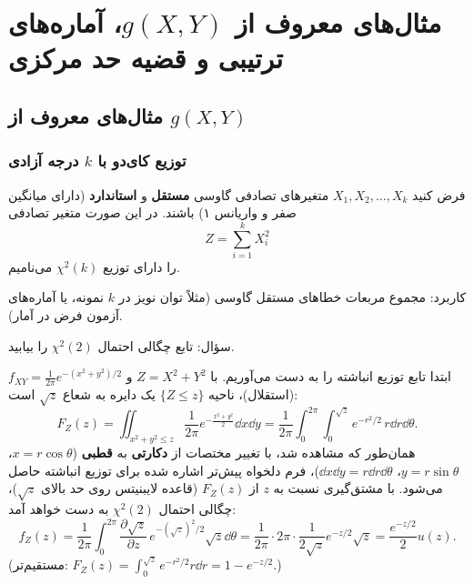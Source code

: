\chapter{مثال‌های معروف از $g(X,Y)$، آماره‌های ترتیبی و قضیه حد مرکزی}

\section{مثال‌های معروف از $g(X,Y)$}

\subsection{توزیع کای‌دو  با $k$ درجه آزادی}

\begin{definition}
فرض کنید $X_1,X_2,\ldots,X_k$ متغیرهای تصادفی گاوسی \textbf{مستقل} و \textbf{استاندارد} (دارای میانگین صفر و واریانس ۱) باشند. در این صورت متغیر تصادفی
\[
Z=\sum_{i=1}^{k}X_i^2
\]
را دارای توزیع $\chi^2(k)$ می‌نامیم.
\end{definition}
کاربرد: مجموع مربعات خطاهای مستقل گاوسی (مثلاً توان نویز در $k$ نمونه، یا آماره‌های آزمون فرض در آمار).

\begin{example}
\textcolor{red!70!black}{سؤال:} تابع چگالی احتمال $\chi^2(2)$ را بیابید.
\begin{solution}
ابتدا تابع توزیع انباشته را به دست می‌آوریم. با $Z=X^2+Y^2$ و $f_{XY}=\frac{1}{2\pi}e^{-(x^2+y^2)/2}$ (استقلال)، ناحیه $\{Z\le z\}$ یک دایره به شعاع $\sqrt z$ است:
\[
F_Z(z)=\iint_{x^2+y^2\le z}\frac{1}{2\pi}e^{-\frac{x^2+y^2}{2}}\dd x\dd y=\frac{1}{2\pi}\int_0^{2\pi}\!\!\int_0^{\sqrt z}e^{-r^2/2}\,r\dd r\dd\theta .
\]
همان‌طور که مشاهده شد، با تغییر مختصات از \textbf{دکارتی} به \textbf{قطبی} ($x=r\cos\theta$، $y=r\sin\theta$، $\dd x\dd y=r\dd r\dd\theta$)، فرم دلخواه پیش‌تر اشاره شده برای توزیع انباشته حاصل می‌شود. با مشتق‌گیری نسبت به $z$ از $F_Z(z)$ (قاعده لایبنیتس روی حد بالای $\sqrt z$)، چگالی احتمال $\chi^2(2)$ به دست خواهد آمد:
\[
f_Z(z)=\frac{1}{2\pi}\int_0^{2\pi}\frac{\partial\sqrt z}{\partial z}\,e^{-(\sqrt z)^2/2}\sqrt z\dd\theta=\frac{1}{2\pi}\cdot2\pi\cdot\frac{1}{2\sqrt z}e^{-z/2}\sqrt z=\frac{e^{-z/2}}{2}u(z).
\]
(مستقیم‌تر: $F_Z(z)=\int_0^{\sqrt z}e^{-r^2/2}r\dd r=1-e^{-z/2}$.)
\end{solution}
\end{example}

